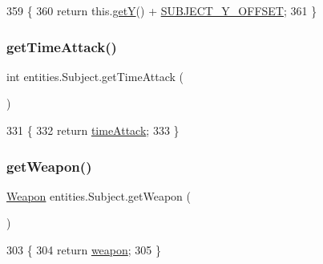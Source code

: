 \begin{DoxyCode}
359                                \{
360         \textcolor{keywordflow}{return} this.\mbox{\hyperlink{classorg_1_1newdawn_1_1slick_1_1geom_1_1_shape_a5f334f962d8fc525d522fe0f8ac20b35}{getY}}() + \mbox{\hyperlink{classentities_1_1_subject_a2d61d20205e6f806d5eabac535949d4a}{SUBJECT\_Y\_OFFSET}};
361     \}
\end{DoxyCode}
\mbox{\label{classentities_1_1_subject_aba88edce7404e7379cc8c16566d33f80}} 
\subsubsection{\texorpdfstring{get\+Time\+Attack()}{getTimeAttack()}}
{\footnotesize\ttfamily int entities.\+Subject.\+get\+Time\+Attack (\begin{DoxyParamCaption}{ }\end{DoxyParamCaption})\hspace{0.3cm}{\ttfamily [inline]}}


\begin{DoxyCode}
331                                \{
332         \textcolor{keywordflow}{return} \mbox{\hyperlink{classentities_1_1_subject_a497b24a97e5d4835bd5f8c70584701e2}{timeAttack}};
333     \}
\end{DoxyCode}
\mbox{\label{classentities_1_1_subject_a83e9ae12f3fc398ba7e9b7381e7b23b2}} 
\subsubsection{\texorpdfstring{get\+Weapon()}{getWeapon()}}
{\footnotesize\ttfamily \mbox{\hyperlink{classitems_1_1weapons_1_1_weapon}{Weapon}} entities.\+Subject.\+get\+Weapon (\begin{DoxyParamCaption}{ }\end{DoxyParamCaption})\hspace{0.3cm}{\ttfamily [inline]}}


\begin{DoxyCode}
303                               \{
304         \textcolor{keywordflow}{return} \mbox{\hyperlink{classentities_1_1_subject_abb65e5fdf2a2b62efa2c9b1368c83f15}{weapon}};
305     \}
\end{DoxyCode}
\mbox{\label{classentities_1_1_subject_a8f7fce95025c0e91f513879c1f8bbc87}} 
